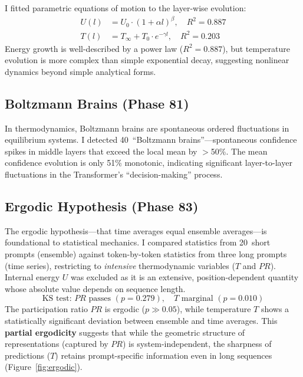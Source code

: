 \documentclass[11pt,a4paper]{article}
\begin{document}
I fitted parametric equations of motion to the layer-wise evolution:
\begin{align}
    U(l) &= U_0 \cdot (1 + \alpha l)^\beta, \quad R^2 = 0.887 \label{eq:U_evolution} \\
    T(l) &= T_\infty + T_0 \cdot e^{-\gamma l}, \quad R^2 = 0.203 \label{eq:T_evolution}
\end{align}
Energy growth is well-described by a power law ($R^2 = 0.887$), but temperature evolution is more complex than simple exponential decay, suggesting nonlinear dynamics beyond simple analytical forms.

\FloatBarrier
\subsection{Boltzmann Brains (Phase 81)}

In thermodynamics, Boltzmann brains are spontaneous ordered fluctuations in equilibrium systems. I detected 40~``Boltzmann brains''---spontaneous confidence spikes in middle layers that exceed the local mean by $>$50\%. The mean confidence evolution is only 51\% monotonic, indicating significant layer-to-layer fluctuations in the Transformer's ``decision-making'' process.

\FloatBarrier
\subsection{Ergodic Hypothesis (Phase 83)}

The ergodic hypothesis---that time averages equal ensemble averages---is foundational to statistical mechanics. I compared statistics from 20~short prompts (ensemble) against token-by-token statistics from three long prompts (time series), restricting to \textit{intensive} thermodynamic variables ($T$ and $PR$). Internal energy $U$ was excluded as it is an extensive, position-dependent quantity whose absolute value depends on sequence length.
\begin{equation}
    \text{KS test: } PR \text{ passes } (p = 0.279), \quad T \text{ marginal } (p = 0.010)
    \label{eq:ergodic}
\end{equation}
The participation ratio $PR$ is ergodic ($p \gg 0.05$), while temperature $T$ shows a statistically significant deviation between ensemble and time averages. This \textbf{partial ergodicity} suggests that while the geometric structure of representations (captured by $PR$) is system-independent, the sharpness of predictions ($T$) retains prompt-specific information even in long sequences (Figure~\ref{fig:ergodic}).
\end{document}
